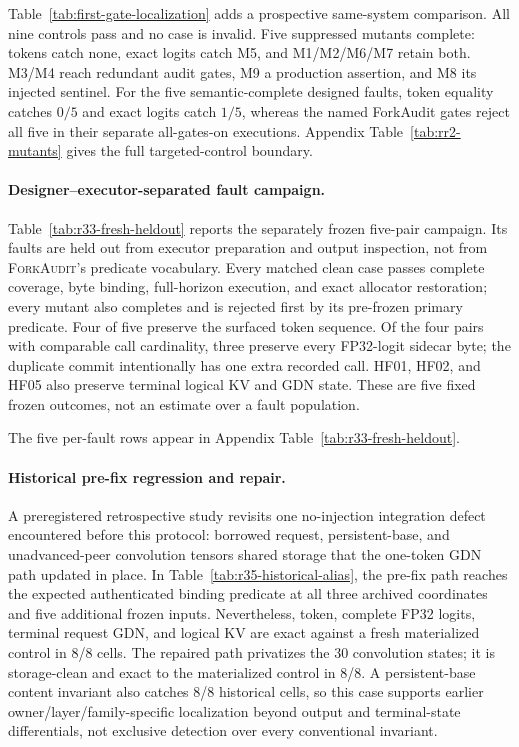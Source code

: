 \documentclass{article}
\newcommand{\method}{\textsc{ForkAudit}}
\begin{document}


Table~\ref{tab:first-gate-localization} adds a prospective same-system
comparison.  All nine controls pass and no case is invalid.  Five suppressed
mutants complete: tokens catch none, exact logits catch M5, and M1/M2/M6/M7
retain both.  M3/M4 reach redundant audit gates, M9 a production assertion,
and M8 its injected sentinel.  For the five semantic-complete designed faults,
token equality catches $0/5$ and exact logits catch $1/5$, whereas the named
ForkAudit gates reject all five in their separate all-gates-on executions.
Appendix Table~\ref{tab:rr2-mutants} gives the full targeted-control boundary.

\paragraph{Designer--executor-separated fault campaign.}
Table~\ref{tab:r33-fresh-heldout} reports the separately frozen five-pair
campaign.  Its faults are held out from executor preparation and output
inspection, not from \method{}'s predicate vocabulary.  Every matched clean
case passes complete coverage, byte binding,
full-horizon execution, and exact allocator restoration; every mutant also
completes and is rejected first by its pre-frozen primary predicate.  Four of
five preserve the surfaced token sequence.  Of the four pairs with comparable
call cardinality, three preserve every FP32-logit sidecar byte; the duplicate
commit intentionally has one extra recorded call.  HF01, HF02, and HF05 also
preserve terminal logical KV and GDN state.  These are five fixed frozen
outcomes, not an estimate over a fault population.

The five per-fault rows appear in Appendix
Table~\ref{tab:r33-fresh-heldout}.

\paragraph{Historical pre-fix regression and repair.}
A preregistered retrospective study revisits one no-injection integration
defect encountered before this protocol: borrowed request, persistent-base,
and unadvanced-peer convolution tensors shared storage that the one-token GDN
path updated in place.  In Table~\ref{tab:r35-historical-alias}, the pre-fix
path reaches the expected authenticated binding predicate at all three
archived coordinates and five additional frozen inputs.  Nevertheless, token,
complete FP32 logits, terminal request GDN, and logical KV are exact against a
fresh materialized control in 8/8 cells.  The repaired path privatizes the 30
convolution states; it is storage-clean and exact to the materialized control
in 8/8.  A persistent-base content invariant also catches 8/8 historical
cells, so this case supports earlier owner/layer/family-specific localization
beyond output and terminal-state differentials, not exclusive detection over
every conventional invariant.
\end{document}
